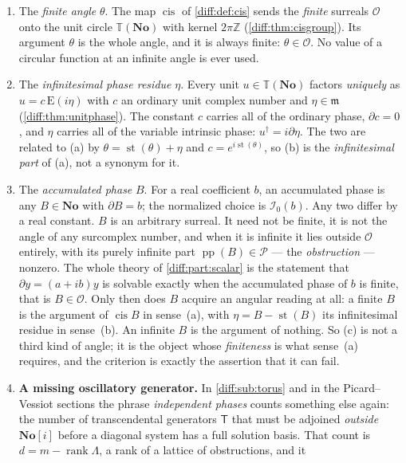 \documentclass[11pt,letterpaper]{article}
\numberwithin{equation}{section}
\theoremstyle{definition}
\theoremstyle{remark}
\newcommand{\No}{\mathbf{No}}
\newcommand{\SC}{\mathbf{No}[i]}
\newcommand{\Z}{\mathbb Z}
\newcommand{\der}{\partial}
\newcommand{\Ofin}{\mathcal O}
\newcommand{\mm}{\mathfrak m}
\newcommand{\Pcl}{\mathcal P}
\newcommand{\Izero}{\mathcal I_{0}}
\newcommand{\pp}{\operatorname{pp}}
\newcommand{\st}{\operatorname{st}}
\newcommand{\cis}{\operatorname{cis}}
\newcommand{\Emm}{\mathrm{E}}
\newcommand{\Tor}{\mathbb T}
\begin{document}
\begin{convention}
\label{diff:conv:phases}
\begin{enumerate}[label=\textup{(\alph*)},leftmargin=2.4em]
\item The \emph{finite angle} $\theta$. The map $\cis$ of
\cref{diff:def:cis} sends the \emph{finite} surreals $\Ofin$ onto the unit
circle $\Tor(\No)$ with kernel $2\pi\Z$
(\cref{diff:thm:cisgroup}). Its argument $\theta$ is the whole angle, and it is
always finite: $\theta\in\Ofin$. No value of a circular function at an infinite
angle is ever used.
\item The \emph{infinitesimal phase residue} $\eta$. Every unit
$u\in\Tor(\No)$ factors \emph{uniquely} as $u=c\,\Emm(i\eta)$ with $c$ an
ordinary unit complex number and $\eta\in\mm$
(\cref{diff:thm:unitphase}). The constant $c$ carries all of the ordinary
phase, $\der c=0$, and $\eta$ carries all of the variable intrinsic phase:
$u^{\dagger}=i\der\eta$. The two are related to (a) by
$\theta=\st(\theta)+\eta$ and $c=e^{i\st(\theta)}$, so (b) is the
\emph{infinitesimal part} of (a), not a synonym for it.
\item The \emph{accumulated phase} $B$. For a real coefficient $b$, an
accumulated phase is any $B\in\No$ with $\der B=b$; the normalized choice is
$\Izero(b)$. Any two differ by a real constant. $B$ is an arbitrary surreal.
It need not be finite, it is not the angle of any surcomplex number, and when
it is infinite it lies outside $\Ofin$ entirely, with its purely infinite part
$\pp(B)\in\Pcl$ --- the \emph{obstruction} --- nonzero. The whole theory of
\cref{diff:part:scalar} is the statement that $\der y=(a+ib)y$ is solvable
exactly when the accumulated phase of $b$ is finite, that is $B\in\Ofin$.
Only then does $B$ acquire an angular reading at all: a finite $B$ is the
argument of $\cis B$ in sense~(a), with $\eta=B-\st(B)$ its infinitesimal
residue in sense~(b).  An infinite $B$ is the argument of nothing.  So (c) is
not a third kind of angle; it is the object whose \emph{finiteness} is what
sense~(a) requires, and the criterion is exactly the assertion that it can
fail.
\item \textbf{A missing oscillatory generator.}  In
\cref{diff:sub:torus} and in the Picard--Vessiot sections the phrase
\emph{independent phases} counts something else again: the number of
transcendental generators $\mathsf T$ that must be adjoined \emph{outside}
$\SC$ before a diagonal system has a full solution basis.  That count is
$d=m-\operatorname{rank}\Lambda$, a rank of a lattice of obstructions, and it

\end{enumerate}
\end{convention}
\end{document}
